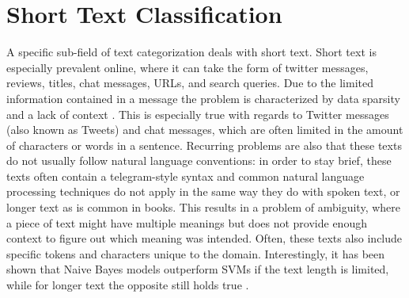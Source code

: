 \section{Short Text Classification}

A specific sub-field of text categorization deals with short text. Short text is especially prevalent online, where it can take the form of twitter messages, reviews, titles, chat messages, URLs, and search queries. Due to the limited information contained in a message the problem is characterized by data sparsity and a lack of context \cite{Wang2017}. This is especially true with regards to Twitter messages (also known as Tweets) and chat messages, which are often limited in the amount of characters or words in a sentence. Recurring problems are also that these texts do not usually follow natural language conventions: in order to stay brief, these texts often contain a telegram-style syntax and common natural language processing techniques do not apply in the same way they do with spoken text, or longer text as is common in books. This results in a problem of ambiguity, where a piece of text might have multiple meanings but does not provide enough context to figure out which meaning was intended. Often, these texts also include specific tokens and characters unique to the domain. Interestingly, it has been shown that Naive Bayes models outperform SVMs if the text length is limited, while for longer text the opposite still holds true \cite{Wang2012}.

